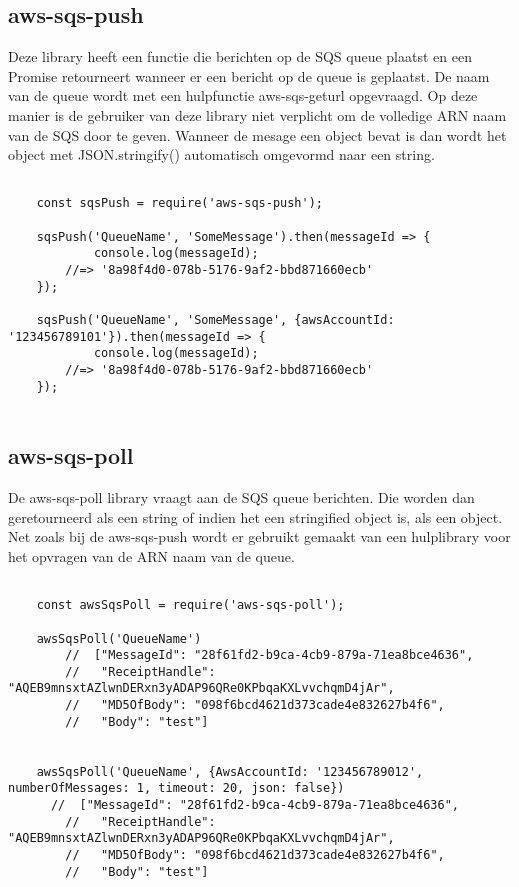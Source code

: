 \subsection{aws-sqs-push}
Deze library heeft een functie die berichten op de SQS queue plaatst en een Promise retourneert wanneer er een bericht op de queue is geplaatst. De naam van de queue wordt met een hulpfunctie aws-sqs-geturl opgevraagd. Op deze manier is de gebruiker van deze library niet verplicht om de volledige ARN naam van de SQS door te geven. Wanneer de mesage een object bevat is dan wordt het object met JSON.stringify() automatisch omgevormd naar een string.

\begin{lstlisting}[caption=Voorbeeld dat data plaatst op een SQS queue met behulp van de aws-sqs-push library]

	const sqsPush = require('aws-sqs-push');

	sqsPush('QueueName', 'SomeMessage').then(messageId => {
    		console.log(messageId);
    	//=> '8a98f4d0-078b-5176-9af2-bbd871660ecb'
	});

	sqsPush('QueueName', 'SomeMessage', {awsAccountId: '123456789101'}).then(messageId => {
    		console.log(messageId);
    	//=> '8a98f4d0-078b-5176-9af2-bbd871660ecb'
	});
	
\end{lstlisting}
\clearpage
\subsection{aws-sqs-poll}
De aws-sqs-poll library vraagt aan de SQS queue berichten. Die worden dan geretourneerd als een string of indien het een stringified object is, als een object. Net zoals bij de aws-sqs-push wordt er gebruikt gemaakt van een hulplibrary voor het opvragen van de ARN naam van de queue.

\begin{lstlisting}[caption=Voorbeeld hoe berichten worden opgehaald van de SQS queue]

	const awsSqsPoll = require('aws-sqs-poll');

	awsSqsPoll('QueueName')
    	//  ["MessageId": "28f61fd2-b9ca-4cb9-879a-71ea8bce4636",
    	//   "ReceiptHandle": "AQEB9mnsxtAZlwnDERxn3yADAP96QRe0KPbqaKXLvvchqmD4jAr",
    	//   "MD5OfBody": "098f6bcd4621d373cade4e832627b4f6",
    	//   "Body": "test"]


	awsSqsPoll('QueueName', {AwsAccountId: '123456789012', numberOfMessages: 1, timeout: 20, json: false})
  	  //  ["MessageId": "28f61fd2-b9ca-4cb9-879a-71ea8bce4636",
    	//   "ReceiptHandle": "AQEB9mnsxtAZlwnDERxn3yADAP96QRe0KPbqaKXLvvchqmD4jAr",
    	//   "MD5OfBody": "098f6bcd4621d373cade4e832627b4f6",
    	//   "Body": "test"]
	
\end{lstlisting}

